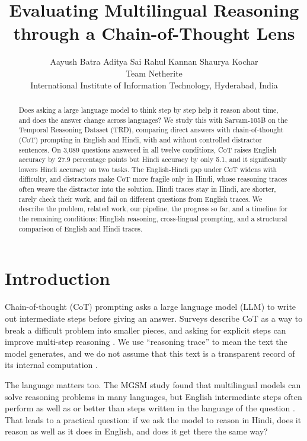\documentclass[11pt]{article}
\title{Evaluating Multilingual Reasoning through a Chain-of-Thought Lens}
\author{
  Aayush Batra \quad Aditya Sai \quad Rahul Kannan \quad Shaurya Kochar \\[0.4em]
  Team Netherite \\
  International Institute of Information Technology, Hyderabad, India
}
\begin{document}
\maketitle

\begin{abstract}
Does asking a large language model to think step by step help it reason about time, and does the answer change across languages? We study this with Sarvam-105B on the Temporal Reasoning Dataset (TRD), comparing direct answers with chain-of-thought (CoT) prompting in English and Hindi, with and without controlled distractor sentences. On 3,089 questions answered in all twelve conditions, CoT raises English accuracy by 27.9 percentage points but Hindi accuracy by only 5.1, and it significantly lowers Hindi accuracy on two tasks. The English-Hindi gap under CoT widens with difficulty, and distractors make CoT more fragile only in Hindi, whose reasoning traces often weave the distractor into the solution. Hindi traces stay in Hindi, are shorter, rarely check their work, and fail on different questions from English traces. We describe the problem, related work, our pipeline, the progress so far, and a timeline for the remaining conditions: Hinglish reasoning, cross-lingual prompting, and a structural comparison of English and Hindi traces.
\end{abstract}

\section{Introduction}
\label{sec:intro}

Chain-of-thought (CoT) prompting asks a large language model (LLM) to write out intermediate steps before giving an answer. Surveys describe CoT as a way to break a difficult problem into smaller pieces, and asking for explicit steps can improve multi-step reasoning \citep{wei-etal-2022-chain,huang-chang-2023-towards}. We use ``reasoning trace'' to mean the text the model generates, and we do not assume that this text is a transparent record of its internal computation \citep{turpin-etal-2023-unfaithful}.

The language matters too. The MGSM study found that multilingual models can solve reasoning problems in many languages, but English intermediate steps often perform as well as or better than steps written in the language of the question \citep{shi-etal-2023-mgsm}. That leads to a practical question: if we ask the model to reason in Hindi, does it reason as well as it does in English, and does it get there the same way?
\end{document}
